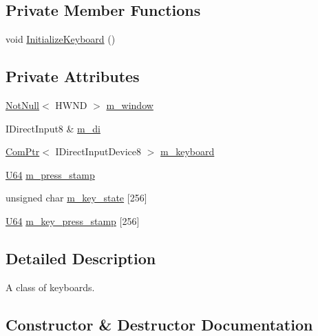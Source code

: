 \subsection*{Private Member Functions}
\begin{DoxyCompactItemize}
\item 
void \mbox{\hyperlink{classmage_1_1input_1_1_keyboard_1_1_impl_ae4854db552c4651503ec30bb6a477cae}{Initialize\+Keyboard}} ()
\end{DoxyCompactItemize}
\subsection*{Private Attributes}
\begin{DoxyCompactItemize}
\item 
\mbox{\hyperlink{namespacemage_a8769f9d670d6b585ea306cb1062af94b}{Not\+Null}}$<$ H\+W\+ND $>$ \mbox{\hyperlink{classmage_1_1input_1_1_keyboard_1_1_impl_a55d12479108b554c1139bad8318994db}{m\+\_\+window}}
\item 
I\+Direct\+Input8 \& \mbox{\hyperlink{classmage_1_1input_1_1_keyboard_1_1_impl_a87c2eeea3ea7fdaa56cbb6f46235d2e5}{m\+\_\+di}}
\item 
\mbox{\hyperlink{namespacemage_ae74f374780900893caa5555d1031fd79}{Com\+Ptr}}$<$ I\+Direct\+Input\+Device8 $>$ \mbox{\hyperlink{classmage_1_1input_1_1_keyboard_1_1_impl_a933e7f1f86e74c9f761018ef54fe5298}{m\+\_\+keyboard}}
\item 
\mbox{\hyperlink{namespacemage_a6672cf3c861707ce4a3235a3eb43941d}{U64}} \mbox{\hyperlink{classmage_1_1input_1_1_keyboard_1_1_impl_adfe57f2b8e59adae407850d66419bf5a}{m\+\_\+press\+\_\+stamp}}
\item 
unsigned char \mbox{\hyperlink{classmage_1_1input_1_1_keyboard_1_1_impl_a0ac844ac40552bf68ddc12fabc7d3626}{m\+\_\+key\+\_\+state}} \mbox{[}256\mbox{]}
\item 
\mbox{\hyperlink{namespacemage_a6672cf3c861707ce4a3235a3eb43941d}{U64}} \mbox{\hyperlink{classmage_1_1input_1_1_keyboard_1_1_impl_aac27a1a8210f933a9e0598ce8a0fc2cb}{m\+\_\+key\+\_\+press\+\_\+stamp}} \mbox{[}256\mbox{]}
\end{DoxyCompactItemize}


\subsection{Detailed Description}
A class of keyboards. 

\subsection{Constructor \& Destructor Documentation}
\mbox{\label{classmage_1_1input_1_1_keyboard_1_1_impl_a07a7e889342075f32d2484e8f0a6006f}} 
